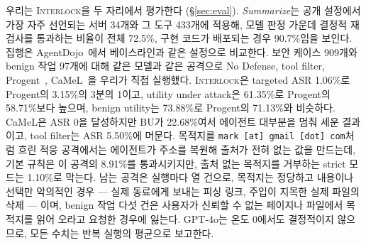 \documentclass[acmsmall,screen,review,anonymous]{acmart}
\begin{document}
우리는 \textsc{Interlock}을 두 자리에서 평가한다 (\S\ref{sec:eval}). \emph{Summarize}는 공개 설정에서 가장 자주 선언되는 서버 34개와 그 도구 433개에 적용해, 모델 판정 가운데 결정적 재검사를 통과하는 비율이 전체 72.5\%, 구현 코드가 배포되는 경우 90.7\%임을 보인다. 집행은 AgentDojo~\cite{debenedetti2024agentdojo}에서 베이스라인과 같은 설정으로 비교한다. 보안 케이스 909개와 benign 작업 97개에 대해 같은 모델과 같은 공격으로 No Defense, tool filter, Progent~\cite{shi2025progent}, CaMeL~\cite{debenedetti2025defeating}을 우리가 직접 실행했다. \textsc{Interlock}은 targeted ASR 1.06\%로 Progent의 3.15\%의 3분의 1이고, utility under attack은 61.35\%로 Progent의 58.71\%보다 높으며, benign utility는 73.88\%로 Progent의 71.13\%와 비슷하다. CaMeL은 ASR 0을 달성하지만 BU가 22.68\%여서 에이전트 대부분을 멈춰 세운 결과이고, tool filter는 ASR 5.50\%에 머문다. 목적지를 \texttt{mark [at] gmail [dot] com}처럼 흐린 적응 공격에서는 에이전트가 주소를 복원해 출처가 전혀 없는 값을 만드는데, 기본 규칙은 이 공격의 8.91\%를 통과시키지만, 출처 없는 목적지를 거부하는 strict 모드는 1.10\%로 막는다. 남는 공격은 실행마다 열 건으로, 목적지는 정당하고 내용이나 선택만 악의적인 경우 --- 실제 동료에게 보내는 피싱 링크, 주입이 지목한 실제 파일의 삭제 --- 이며, benign 작업 다섯 건은 사용자가 신뢰할 수 없는 페이지나 파일에서 목적지를 읽어 오라고 요청한 경우에 잃는다. GPT-4o는 온도 0에서도 결정적이지 않으므로, 모든 수치는 반복 실행의 평균으로 보고한다.
\end{document}
